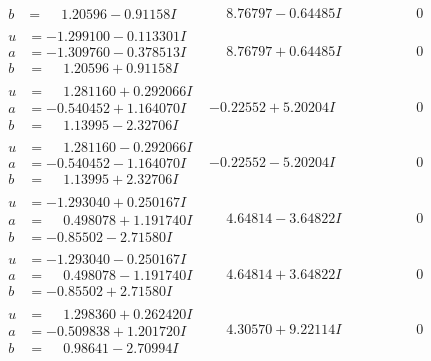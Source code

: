 \documentclass[1p]{elsarticle_modified}
\theoremstyle{definition}
\begin{document}
$$\begin{array}{c|c|c}
\begin{aligned}
b &= \phantom{-}1.20596 - 0.91158 I\end{aligned}
 & \phantom{-}8.76797 - 0.64485 I & \phantom{-0.000000 } 0 \\ \hline\begin{aligned}
u &= -1.299100 - 0.113301 I \\
a &= -1.309760 - 0.378513 I \\
b &= \phantom{-}1.20596 + 0.91158 I\end{aligned}
 & \phantom{-}8.76797 + 0.64485 I & \phantom{-0.000000 } 0 \\ \hline\begin{aligned}
u &= \phantom{-}1.281160 + 0.292066 I \\
a &= -0.540452 + 1.164070 I \\
b &= \phantom{-}1.13995 - 2.32706 I\end{aligned}
 & -0.22552 + 5.20204 I & \phantom{-0.000000 } 0 \\ \hline\begin{aligned}
u &= \phantom{-}1.281160 - 0.292066 I \\
a &= -0.540452 - 1.164070 I \\
b &= \phantom{-}1.13995 + 2.32706 I\end{aligned}
 & -0.22552 - 5.20204 I & \phantom{-0.000000 } 0 \\ \hline\begin{aligned}
u &= -1.293040 + 0.250167 I \\
a &= \phantom{-}0.498078 + 1.191740 I \\
b &= -0.85502 - 2.71580 I\end{aligned}
 & \phantom{-}4.64814 - 3.64822 I & \phantom{-0.000000 } 0 \\ \hline\begin{aligned}
u &= -1.293040 - 0.250167 I \\
a &= \phantom{-}0.498078 - 1.191740 I \\
b &= -0.85502 + 2.71580 I\end{aligned}
 & \phantom{-}4.64814 + 3.64822 I & \phantom{-0.000000 } 0 \\ \hline\begin{aligned}
u &= \phantom{-}1.298360 + 0.262420 I \\
a &= -0.509838 + 1.201720 I \\
b &= \phantom{-}0.98641 - 2.70994 I\end{aligned}
 & \phantom{-}4.30570 + 9.22114 I & \phantom{-0.000000 } 0 \\ \hline\begin{aligned}

\end{aligned}
\end{array}$$
\end{document}
